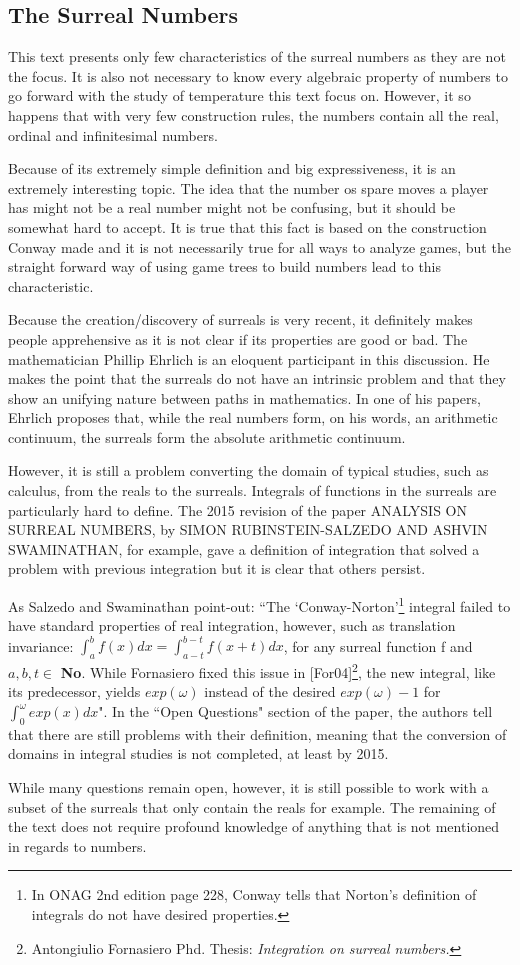 \subsection*{The Surreal Numbers}

This text presents only few characteristics of the surreal numbers as they are not the focus. It is also not necessary to know every algebraic property of numbers to go forward with the study of temperature this text focus on. However, it so happens that with very few construction rules, the numbers contain all the real, ordinal and infinitesimal numbers.

Because of its extremely simple definition and big expressiveness, it is an extremely interesting topic. The idea that the number os spare moves a player has might not be a real number might not be confusing, but it should be somewhat hard to accept. It is true that this fact is based on the construction Conway made and it is not necessarily true for all ways to analyze games, but the straight forward way of using game trees to build numbers lead to this characteristic.

Because the creation/discovery of surreals is very recent, it definitely makes people apprehensive as it is not clear if its properties are good or bad. The mathematician Phillip Ehrlich is an eloquent participant in this discussion. He makes the point that the surreals do not have an intrinsic problem and that they show an unifying nature between paths in mathematics. In one of his papers, Ehrlich proposes that, while the real numbers form, on his words, an arithmetic continuum, the surreals form the absolute arithmetic continuum.

However, it is still a problem converting the domain of typical studies, such as calculus, from the reals to the surreals. Integrals of functions in the surreals are particularly hard to define. The 2015 revision of the paper ANALYSIS ON SURREAL NUMBERS, by SIMON RUBINSTEIN-SALZEDO AND ASHVIN SWAMINATHAN, for example, gave a definition of integration that solved a problem with previous integration but it is clear that others persist.

As Salzedo and Swaminathan point-out: ``The `Conway-Norton'\footnote{In ONAG 2nd edition page 228, Conway  tells that Norton's definition of integrals do not have desired properties.}
integral failed to have standard properties of real integration, however, such as translation
invariance: $\int_a^bf(x)dx = \int_{a-t}^{b-t}f(x+t)dx$, for any surreal function f and $a,b,t\in$ \textbf{No}. While Fornasiero fixed this issue in [For04]\footnote{Antongiulio Fornasiero Phd. Thesis: \textit{Integration on surreal numbers.}}, the new integral, like its predecessor, yields
$exp(\omega)$ instead of the desired $exp(\omega)-1$ for $\int_0^{\omega}exp(x)dx$". In the ``Open Questions" section of  the paper, the authors tell that there are still problems with their definition, meaning that the conversion of domains in integral studies is not completed, at least by 2015.

While many questions remain open, however, it is still possible to work with a subset of the surreals that only contain the reals for example. The remaining of the text does not require profound knowledge of anything that is not mentioned in regards to numbers.









